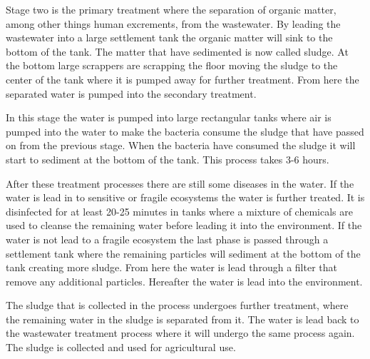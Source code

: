 Stage two is the primary treatment where the separation of organic matter, among other things human excrements, from the wastewater. By leading the wastewater into a large settlement tank the organic matter will sink to the bottom of the tank. The matter that have sedimented is now called sludge. At the bottom large scrappers are scrapping the floor moving the sludge to the center of the tank where it is pumped away for further treatment. From here the separated water is pumped into the secondary treatment. 

In this stage the water is pumped into large rectangular tanks where air is pumped into the water to make the bacteria consume the sludge that have passed on from the previous stage. When the bacteria have consumed the sludge it will start to sediment at the bottom of the tank. This process takes 3-6 hours.  

After these treatment processes there are still some diseases in the water. If the water is lead in to sensitive or fragile ecosystems the water is further treated. It is disinfected for at least 20-25 minutes in tanks where a mixture of chemicals are used to cleanse the remaining water before leading it into the environment. If the water is not lead to a fragile ecosystem the last phase is passed through a settlement tank where the remaining particles will sediment at the bottom of the tank creating more sludge. From here the water is lead through a filter that remove any additional particles. Hereafter the water is lead into the environment. 

The sludge that is collected in the process undergoes further treatment, where the remaining water in the sludge is separated from it. The water is lead back to the wastewater treatment process where it will undergo the same process again. The sludge is collected and used for agricultural use.





